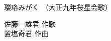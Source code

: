 \documentclass[10pt,b5j]{tarticle} %
\begin{document}
\begin{minipage}[c]{0.7\hsize} %
    \begin{center}
        {\LARGE
            瓔珞みがく %
        }
        {\small 
            （大正九年桜星会歌） %
        }
    \end{center}
\end{minipage}
\begin{minipage}[c]{0.3\hsize} %
    \begin{flushright} %
        佐藤一雄君 作歌\\置塩奇君 作曲 %
    \end{flushright}
\end{minipage}
\end{document}
